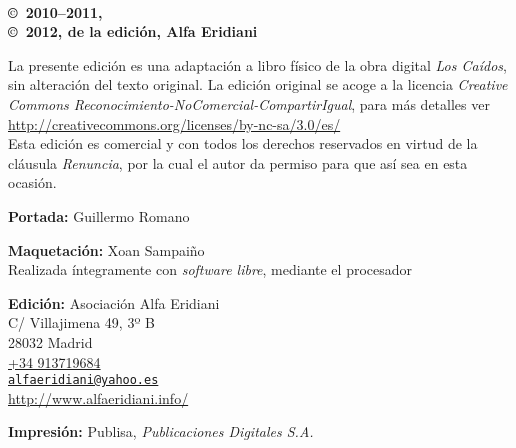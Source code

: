 \noindent
\textbf{\titlename}\\
\authorname

\footnotesize

\bigskip\bigskip\noindent
\textbf{\copyright\ 2010--2011, \authorname}\\
\textbf{\copyright\ 2012, de la edición, Alfa Eridiani}\\
\raggedright La presente edición es una adaptación a libro físico de la obra digital \emph{Los Caídos}, sin alteración del texto original. La edición original se acoge a la licencia \emph{Creative Commons Reconocimiento-NoComercial-CompartirIgual}, para más detalles ver \url{http://creativecommons.org/licenses/by-nc-sa/3.0/es/}\\
Esta edición es comercial y con todos los derechos reservados en virtud de la cláusula \emph{Renuncia}, por la cual el autor da permiso para que así sea en esta ocasión.

\footnotesize

\bigskip\noindent
\textbf{Portada:} Guillermo Romano

\smallskip\noindent
\textbf{Maquetación:} Xoan Sampaiño\\
Realizada íntegramente con \emph{software libre}, mediante el procesador \LaTeXe

\bigskip\noindent
\textbf{Edición:} Asociación Alfa Eridiani\\
C/ Villajimena 49, 3º B\\
28032 Madrid\\
\href{tel:+34913719684}{+34 913719684}\\
\href{mailto:alfaeridiani@yahoo.es}{\nolinkurl{alfaeridiani@yahoo.es}}\\
\url{http://www.alfaeridiani.info/}

\bigskip\noindent
\textbf{Impresión:} Publisa, \emph{Publicaciones Digitales S.A.}

\normalsize

\endinput
